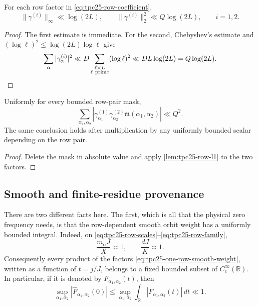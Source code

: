 \begin{lemma}
\label{lem:tpc25-row-energy}
For each row factor in \eqref{eq:tpc25-row-coefficient},
\begin{equation}
 \|\gamma^{(i)}\|_\infty\ll\log(2L),
 \qquad
 \|\gamma^{(i)}\|_2^2\ll Q\log(2L),
 \qquad i=1,2.
 \label{eq:tpc25-row-energy}
\end{equation}
\end{lemma}

\begin{proof}
The first estimate is immediate.  For the second, Chebyshev's estimate
and \((\log\ell)^2\le\log(2L)\log\ell\) give
\[
 \sum_\alpha|\gamma^{(i)}_\alpha|^2
 \ll D\sum_{\substack{\ell\asymp L\\\ell\ {\rm prime}}}
 (\log\ell)^2
 \ll DL\log(2L)=Q\log(2L).
\]
\end{proof}

\begin{corollary}
\label{cor:tpc25-pair-mass}
Uniformly for every bounded row-pair mask,
\begin{equation}
 \sum_{\alpha_1,\alpha_2}
 |\gamma_{\alpha_1}^{(1)}\gamma_{\alpha_2}^{(2)}
   \mathfrak m(\alpha_1,\alpha_2)|
 \ll Q^2.
 \label{eq:tpc25-pair-mass}
\end{equation}
The same conclusion holds after multiplication by any uniformly
bounded scalar depending on the row pair.
\end{corollary}

\begin{proof}
Delete the mask in absolute value and apply
\cref{lem:tpc25-row-l1} to the two factors.
\end{proof}

\subsection{Smooth and finite-residue provenance}

There are two different facts here.  The first, which is all that the
physical zero frequency needs, is that the row-dependent smooth orbit
weight has a uniformly bounded integral.  Indeed, on
\eqref{eq:tpc25-row-scales}--\eqref{eq:tpc25-row-family},
\begin{equation}
 \frac{m_\alpha J}{X}\asymp1,
 \qquad
 \frac{dJ}{K}\asymp1.
 \label{eq:tpc25-scaled-arguments}
\end{equation}
Consequently every product of the factors
\eqref{eq:tpc25-one-row-smooth-weight}, written as a function of
\(t=j/J\), belongs to a fixed bounded subset of
\(C_c^\infty(\mathbb R)\).  In particular, if it is denoted by
\(F_{\alpha_1,\alpha_2}(t)\), then
\begin{equation}
 \sup_{\alpha_1,\alpha_2}
 \left|\widehat F_{\alpha_1,\alpha_2}(0)\right|
 \le
 \sup_{\alpha_1,\alpha_2}\int_{\mathbb R}
 |F_{\alpha_1,\alpha_2}(t)|\,dt
 \ll1.
 \label{eq:tpc25-zero-functional-bound}
\end{equation}

